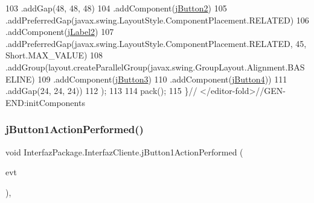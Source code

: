 \begin{DoxyCode}
103                 .addGap(48, 48, 48)
104                 .addComponent(\mbox{\hyperlink{class_interfaz_package_1_1_interfaz_cliente_a0196e2e1cfcbbbc8861c08f6a0a37ae4}{jButton2}})
105                 .addPreferredGap(javax.swing.LayoutStyle.ComponentPlacement.RELATED)
106                 .addComponent(\mbox{\hyperlink{class_interfaz_package_1_1_interfaz_cliente_adddf6bbdd3ebab836af4f159294fd8ff}{jLabel2}})
107                 .addPreferredGap(javax.swing.LayoutStyle.ComponentPlacement.RELATED, 45, Short.MAX\_VALUE)
108                 .addGroup(layout.createParallelGroup(javax.swing.GroupLayout.Alignment.BASELINE)
109                     .addComponent(\mbox{\hyperlink{class_interfaz_package_1_1_interfaz_cliente_a25b735a55e8862dffce033dda1112430}{jButton3}})
110                     .addComponent(\mbox{\hyperlink{class_interfaz_package_1_1_interfaz_cliente_a724801e1312c508ba148b8928739811e}{jButton4}}))
111                 .addGap(24, 24, 24))
112         );
113 
114         pack();
115     \}\textcolor{comment}{// </editor-fold>//GEN-END:initComponents}
\end{DoxyCode}
\mbox{\label{class_interfaz_package_1_1_interfaz_cliente_a0734280a4dc2dfc6f1c2a629118d07dd}} 
\subsubsection{\texorpdfstring{j\+Button1\+Action\+Performed()}{jButton1ActionPerformed()}}
{\footnotesize\ttfamily void Interfaz\+Package.\+Interfaz\+Cliente.\+j\+Button1\+Action\+Performed (\begin{DoxyParamCaption}\item[{java.\+awt.\+event.\+Action\+Event}]{evt }\end{DoxyParamCaption})\hspace{0.3cm}{\ttfamily [inline]}, {\ttfamily [private]}}


